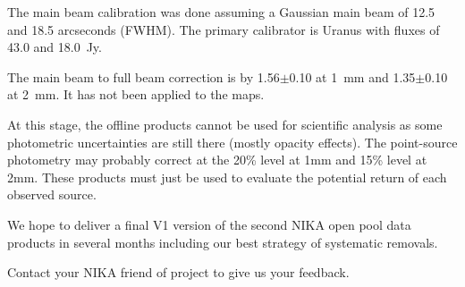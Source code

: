 \documentclass[a4paper,10pt]{article}
\begin{document}
The main beam calibration was done assuming a Gaussian main beam of 12.5 and
18.5 arcseconds (FWHM). The primary calibrator is Uranus with fluxes of 43.0
and 18.0~Jy.

The main beam to full beam correction is by 1.56$\pm$0.10 at 1~mm and
1.35$\pm$0.10 at 2~mm. It has not been applied to the maps.

At this stage, the offline products cannot be used for scientific analysis as
some photometric uncertainties are still there (mostly opacity effects). The
point-source photometry may probably correct at the 20\% level at 1mm and 15\%
level at 2mm. These products must just be used to evaluate the potential
return of each observed source.

We hope to deliver a final V1 version of the second NIKA open pool data
products in several months including our best strategy of systematic removals.
 
Contact your NIKA friend of project to give us your feedback. 

\end{document}

